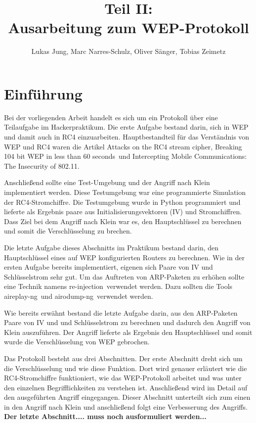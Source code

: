 \documentclass[10pt,a4paper]{article}
\title{Teil II:\\Ausarbeitung zum WEP-Protokoll}
\author{Lukas Jung, Marc Narres-Schulz, Oliver Sänger, Tobias Zeimetz}
\begin{document}
\maketitle
\tableofcontents
\newpage

\section{Einführung}
Bei der vorliegenden Arbeit handelt es sich um ein Protokoll über eine Teilaufgabe im \glqq Hackerpraktikum\grqq. Die erste Aufgabe bestand darin, sich in WEP und damit auch in RC4 einzuarbeiten. Hauptbestandteil für das Verständnis von WEP und RC4 waren die Artikel \glqq Attacks on the RC4 stream cipher\grqq \cite{Kle08}, \glqq Breaking 104 bit WEP in less than 60 seconds\grqq \cite{TWP07}\ und \glqq Intercepting Mobile Communications: The Insecurity of 802.11\grqq \cite{BGW01}.

Anschließend sollte eine Test-Umgebung und der Angriff nach Klein implementiert werden. Diese Testumgebung war eine programmierte Simulation der RC4-Stromchiffre. Die Testumgebung wurde in Python programmiert und lieferte als Ergebnis paare aus Initialisierungsvektoren (IV) und Stromchiffren. Dass Ziel bei dem Angriff nach Klein war es, den Hauptschlüssel zu berechnen und somit die Verschlüsselung zu brechen. 

Die letzte Aufgabe dieses Abschnitts im Praktikum bestand darin, den Hauptschlüssel eines auf WEP konfigurierten Routers zu berechnen. Wie in der ersten Aufgabe bereits implementiert, eigenen sich Paare von IV und Schlüsselstrom sehr gut. Um das Auftreten von ARP-Paketen zu erhöhen sollte eine Technik namens \glqq re-injection\grqq \ verwendet werden.  Dazu sollten die Tools \glqq aireplay-ng\grqq \ und \glqq airodump-ng\grqq \ verwendet werden.

Wie bereits erwähnt bestand die letzte Aufgabe darin, aus den ARP-Paketen Paare von IV und und Schlüsselstrom zu berechnen und dadurch den Angriff von Klein auszuführen. Der Angriff lieferte als Ergebnis den Hauptschlüssel und somit wurde die Verschlüsselung von WEP gebrochen.

Das Protokoll besteht aus drei Abschnitten. Der erste Abschnitt dreht sich um die Verschlüsselung und wie diese Funktion. Dort wird genauer erläutert wie die RC4-Stromchiffre funktioniert, wie das WEP-Protokoll arbeitet und was unter den einzelnen Begrifflichkeiten zu verstehen ist. Anschließend wird im Detail auf den ausgeführten Angriff eingegangen. Dieser Abschnitt unterteilt sich zum einen in den Angriff nach Klein und anschließend folgt eine Verbesserung des Angriffs. \textbf{Der letzte Abschnitt.... muss noch ausformuliert werden...}
\end{document}
